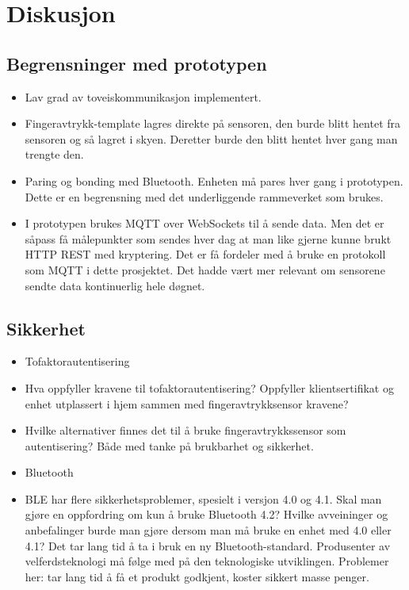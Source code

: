 \chapter{Diskusjon}
\label{ch:discussion}

\section{Begrensninger med
prototypen}\label{begrensninger-med-prototypen}

\begin{itemize}
\tightlist
\item
  Lav grad av toveiskommunikasjon implementert.
\item
  Fingeravtrykk-template lagres direkte på sensoren, den burde blitt
  hentet fra sensoren og så lagret i skyen. Deretter burde den blitt
  hentet hver gang man trengte den.
\item
  Paring og bonding med Bluetooth. Enheten må pares hver gang i
  prototypen. Dette er en begrensning med det underliggende rammeverket
  som brukes.
\item
  I prototypen brukes MQTT over WebSockets til å sende data. Men det er
  såpass få målepunkter som sendes hver dag at man like gjerne kunne
  brukt HTTP REST med kryptering. Det er få fordeler med å bruke en
  protokoll som MQTT i dette prosjektet. Det hadde vært mer relevant om
  sensorene sendte data kontinuerlig hele døgnet.
\end{itemize}

\section{Sikkerhet}\label{sikkerhet}

\begin{itemize}
\tightlist
\item
  Tofaktorautentisering
\item
  Hva oppfyller kravene til tofaktorautentisering? Oppfyller
  klientsertifikat og enhet utplassert i hjem sammen med
  fingeravtrykksensor kravene?
\item
  Hvilke alternativer finnes det til å bruke fingeravtrykkssensor som
  autentisering? Både med tanke på brukbarhet og sikkerhet.
\item
  Bluetooth
\item
  BLE har flere sikkerhetsproblemer, spesielt i versjon 4.0 og 4.1. Skal
  man gjøre en oppfordring om kun å bruke Bluetooth 4.2? Hvilke
  avveininger og anbefalinger burde man gjøre dersom man må bruke en
  enhet med 4.0 eller 4.1? Det tar lang tid å ta i bruk en ny
  Bluetooth-standard. Produsenter av velferdsteknologi må følge med på
  den teknologiske utviklingen. Problemer her: tar lang tid å få et
  produkt godkjent, koster sikkert masse penger.
\end{itemize}

